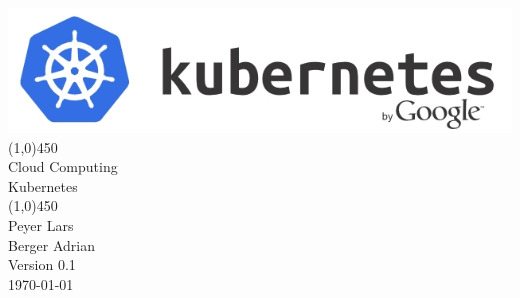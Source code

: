 \begin{titlepage}
	
	\begin{center}
		\includegraphics[width=150mm]{media/titleimage.jpg}\\[10mm]	
		\line(1,0){450}\\[7mm]
		\huge{Cloud Computing \protect\\[10mm] Kubernetes}\\[2mm]
		\line(1,0){450}\\[2cm]
		\large{Peyer Lars}\\[3mm]
		\large{Berger Adrian}\\[15mm]
		\large{Version 0.1}\\[5mm]
		\today\\[20mm]
		
	\end{center}
\end{titlepage}
\newpage
